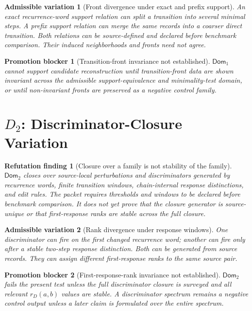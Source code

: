 \documentclass[11pt]{article}
\newcommand{\Dom}{\mathsf{Dom}}
\newtheorem{finding}{Refutation finding}
\newtheorem{variation}{Admissible variation}
\newtheorem{blocker}{Promotion blocker}
\begin{document}
\begin{variation}[Front divergence under exact and prefix support]
An exact recurrence-word support relation can split a transition into several
minimal steps. A prefix support relation can merge the same records into a
coarser direct transition. Both relations can be source-defined and declared
before benchmark comparison. Their induced neighborhoods and fronts need not
agree.
\end{variation}

\begin{blocker}[Transition-front invariance not established]
\(\Dom_1\) cannot support candidate reconstruction until transition-front
data are shown invariant across the admissible support-equivalence and
minimality-test domain, or until non-invariant fronts are preserved as a
negative control family.
\end{blocker}

\section{\texorpdfstring{\(D_2\)}{D2}: Discriminator-Closure Variation}

\begin{finding}[Closure over a family is not stability of the family]
\(\Dom_2\) closes over source-local perturbations and discriminators
generated by recurrence words, finite transition windows, chain-internal
response distinctions, and edit rules. The packet requires thresholds and
windows to be declared before benchmark comparison. It does not yet prove
that the closure generator is source-unique or that first-response ranks are
stable across the full closure.
\end{finding}

\begin{variation}[Rank divergence under response windows]
One discriminator can fire on the first changed recurrence word; another can
fire only after a stable two-step response distinction. Both can be generated
from source records. They can assign different first-response ranks to the
same source pair.
\end{variation}

\begin{blocker}[First-response-rank invariance not established]
\(\Dom_2\) fails the present test unless the full discriminator closure is
surveyed and all relevant \(r_D(a,b)\) values are stable. A discriminator
spectrum remains a negative control output unless a later claim is formulated
over the entire spectrum.
\end{blocker}
\end{document}
